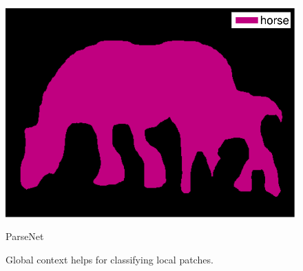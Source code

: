 \documentclass{article} %
\begin{document}
\begin{figure}
\begin{subtable}[b]{0.24\linewidth}
		\includegraphics[width=\linewidth]{figure/2008_007945_context-eps-converted-to.pdf}
		\caption{ParseNet}
	\end{subtable}
	\caption{Global context helps for classifying local patches.}
	\label{fig:globalcontexthelps}
\end{figure}
\end{document}
